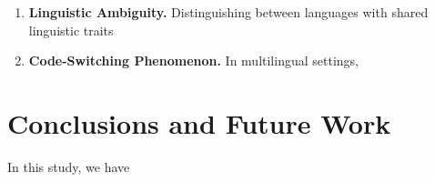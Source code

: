 \documentclass[3p,times]{elsarticle}
\begin{document}
    \begin{enumerate}

        \item \textbf{Linguistic Ambiguity.} Distinguishing between languages with shared linguistic traits

        \item \textbf{Code-Switching Phenomenon.} In multilingual settings,

    \end{enumerate}


    \section{Conclusions and Future Work} \label{sec:conclusions}


    In this study, we have



% 
    
    
\end{document}
